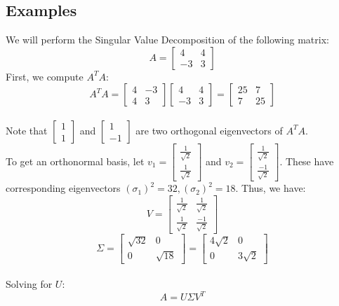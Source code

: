 \documentclass{article}
\begin{document}
\subsection{Examples}
We will perform the Singular Value Decomposition of the following matrix:
$$A = 
\begin{bmatrix}
4& 4\\
-3& 3\end{bmatrix}$$
First, we compute $A^TA$:
$$A^TA=\begin{bmatrix}4& -3\\4& 3\end{bmatrix} 
        \begin{bmatrix}4& 4\\-3& 3\end{bmatrix} =
        \begin{bmatrix}25& 7\\7& 25\end{bmatrix}$$ \\
Note that $\begin{bmatrix}1\\1\end{bmatrix}$ and $\begin{bmatrix}1\\-1\end{bmatrix}$ are two orthogonal eigenvectors of $A^TA$. \\ 
To get an orthonormal basis, let $v_1 = \begin{bmatrix}\frac{1}{\sqrt{2}}\\\frac{1}{\sqrt{2}}\end{bmatrix}$ and $v_2 = \begin{bmatrix}\frac{1}{\sqrt{2}}\\\frac{-1}{\sqrt{2}}\end{bmatrix}$. These have corresponding eigenvectors $(\sigma_1)^2=32, (\sigma_2)^2=18$. Thus, we have:
$$V = \begin{bmatrix}\frac{1}{\sqrt{2}}&\frac{1}{\sqrt{2}}\\\frac{1}{\sqrt{2}}&\frac{-1}{\sqrt{2}}\end{bmatrix}$$
$$\Sigma= \begin{bmatrix}\sqrt{32}& 0\\0& \sqrt{18}\end{bmatrix}= \begin{bmatrix}4\sqrt{2}& 0\\0& 3\sqrt{2}\end{bmatrix}$$ \\
Solving for $U$:
$$A = U \Sigma V^T$$
\end{document}

